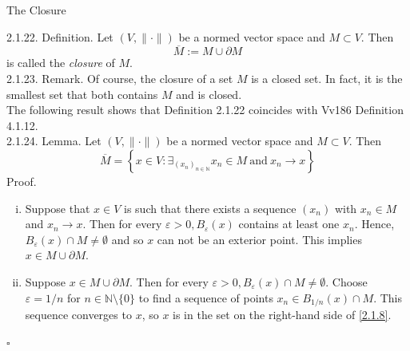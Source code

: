 \documentclass[smaller,hyperref={CJKbookmarks=true}]{beamer}
\newcommand{\N}{\mathbb{N}}
\begin{document}
\begin{frame}{The Closure}
\begin{spacing}{1.05}
\alert{2.1.22. Definition.} Let $(V,\|\cdot\|)$ be a normed vector space and $M\subset V$. Then
\[\overline{M}:=M\cup\partial M\]
is called the \emph{closure} of $M$.\\[6pt]
\alert{2.1.23. Remark.} Of course, the closure of a set $M$ is a closed set. In fact, it is the smallest set that both contains $M$ and is closed.\\[6pt]
The following result shows that Definition 2.1.22 coincides with Vv186 Definition 4.1.12.\\[4pt]
\alert{2.1.24. Lemma.} Let $(V,\|\cdot\|)$ be a normed vector space and $M\subset V$. Then
\begin{equation}\label{2.1.8}
  \overline{M}=\left\{x\in V:\mathop{\exists}_{(x_n)_{n\in\N}}x_n\in M~\text{and}~x_n\to x\right\}
\end{equation}
\newpage
\alert{Proof.}\\
\begin{enumerate}[(i)]
  \item Suppose that $x\in V$ is such that there exists a sequence $(x_n)$ with $x_n\in M$ and $x_n\to x$. Then for every $\varepsilon>0,B_{\varepsilon}(x)$ contains at least one $x_n$. Hence, $B_{\varepsilon}(x)\cap M\neq\emptyset$ and so $x$ can not be an exterior point. This implies $x\in M\cup\partial M$.\\[6pt]
  \item Suppose $x\in M\cup\partial M$. Then for every $\varepsilon>0,B_{\varepsilon}(x)\cap M\neq\emptyset$. Choose $\varepsilon=1/n$ for $n\in\N\setminus\{0\}$ to find a sequence of points $x_n\in B_{1/n}(x)\cap M$. This sequence converges to $x$, so $x$ is in the set on the right-hand side of \eqref{2.1.8}.
\end{enumerate}
\begin{flushright}
  $\square$
\end{flushright}
\end{spacing}
\end{frame}
\end{document}
